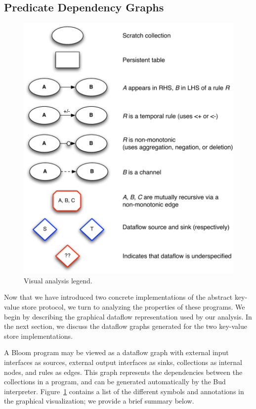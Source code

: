 \subsection{Predicate Dependency Graphs}
\begin{figure}[t]
\centering
\includegraphics[width=0.9\linewidth]{fig/mittalk_legend.pdf}
\vspace{-10pt}
\caption{Visual analysis legend.}
\label{fig:analysis-legend}
\vspace{-2pt}
\end{figure}

Now that we have introduced two concrete implementations of the abstract
key-value store protocol, we turn to analyzing the properties of these
programs. We begin by describing the graphical dataflow representation used by
our analysis. In the next section, we discuss the dataflow graphs generated for
the two key-value store implementations.

A Bloom program may be viewed as a dataflow graph with external input interfaces
as sources, external output interfaces as sinks, collections as internal nodes,
and rules as edges. This graph represents the dependencies between the
collections in a program, and can be generated automatically by the Bud
interpreter. Figure~\ref{fig:analysis-legend} contains a list of the different
symbols and annotations in the graphical visualization; we provide a brief
summary below.


